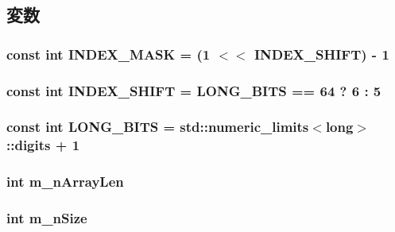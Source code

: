 \subsection{変数}
\hypertarget{classSet_af544f28f2a0f3d2222314eb4dbcba4e8}{
\subsubsection[{INDEX\_\-MASK}]{\setlength{\rightskip}{0pt plus 5cm}const int {\bf INDEX\_\-MASK} = (1 $<$$<$ {\bf INDEX\_\-SHIFT}) -\/ 1}}
\label{classSet_af544f28f2a0f3d2222314eb4dbcba4e8}
\hypertarget{classSet_a33af0963dbe2fdf9ce5b7303c924b673}{
\subsubsection[{INDEX\_\-SHIFT}]{\setlength{\rightskip}{0pt plus 5cm}const int {\bf INDEX\_\-SHIFT} = {\bf LONG\_\-BITS} == 64 ? 6 : 5}}
\label{classSet_a33af0963dbe2fdf9ce5b7303c924b673}
\hypertarget{classSet_a255499bfd2e55c748b3b35f4c0715e07}{
\subsubsection[{LONG\_\-BITS}]{\setlength{\rightskip}{0pt plus 5cm}const int {\bf LONG\_\-BITS} = std::numeric\_\-limits$<$long$>$::digits + 1}}
\label{classSet_a255499bfd2e55c748b3b35f4c0715e07}
\hypertarget{classSet_a195377de8b2a14cb8858ab158a80b916}{
\subsubsection[{m\_\-nArrayLen}]{\setlength{\rightskip}{0pt plus 5cm}int {\bf m\_\-nArrayLen}}}
\label{classSet_a195377de8b2a14cb8858ab158a80b916}
\hypertarget{classSet_a596ca3ad7845fc90a3bc5b0b39f8a439}{
\subsubsection[{m\_\-nSize}]{\setlength{\rightskip}{0pt plus 5cm}int {\bf m\_\-nSize}}}
